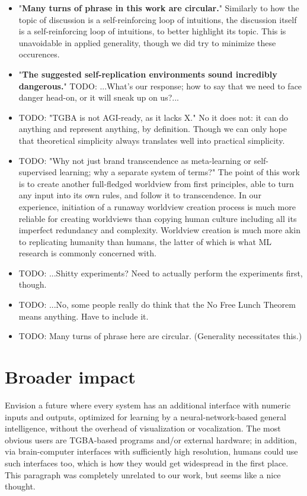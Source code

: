 \documentclass{article}
\begin{document}
\begin{itemize}
\item "\textbf{Many turns of phrase in this work are circular.}" Similarly to how the topic of discussion is a self-reinforcing loop of intuitions, the discussion itself is a self-reinforcing loop of intuitions, to better highlight its topic. This is unavoidable in applied generality, though we did try to minimize these occurences.
\item "\textbf{The suggested self-replication environments sound incredibly dangerous.}" TODO: ...What's our response; how to say that we need to face danger head-on, or it will sneak up on us?...
\item TODO: "TGBA is not AGI-ready, as it lacks X." No it does not: it can do anything and represent anything, by definition. Though we can only hope that theoretical simplicity always translates well into practical simplicity.
\item TODO: "Why not just brand transcendence as meta-learning or self-supervised learning; why a separate system of terms?" The point of this work is to create another full-fledged worldview from first principles, able to turn any input into its own rules, and follow it to transcendence. In our experience, initiation of a runaway worldview creation process is much more reliable for creating worldviews than copying human culture including all its imperfect redundancy and complexity. Worldview creation is much more akin to replicating humanity than humans, the latter of which is what ML research is commonly concerned with.
\item TODO: ...Shitty experiments? Need to actually perform the experiments first, though.
\item TODO: ...No, some people really do think that the No Free Lunch Theorem means anything. Have to include it.
\item TODO: Many turns of phrase here are circular. (Generality necessitates this.)
\end{itemize}

\section{Broader impact}

Envision a future where every system has an additional interface with numeric inputs and outputs, optimized for learning by a neural-network-based general intelligence, without the overhead of visualization or vocalization. The most obvious users are TGBA-based programs and/or external hardware; in addition, via brain-computer interfaces with sufficiently high resolution, humans could use such interfaces too, which is how they would get widespread in the first place. This paragraph was completely unrelated to our work, but seems like a nice thought.
\end{document}
